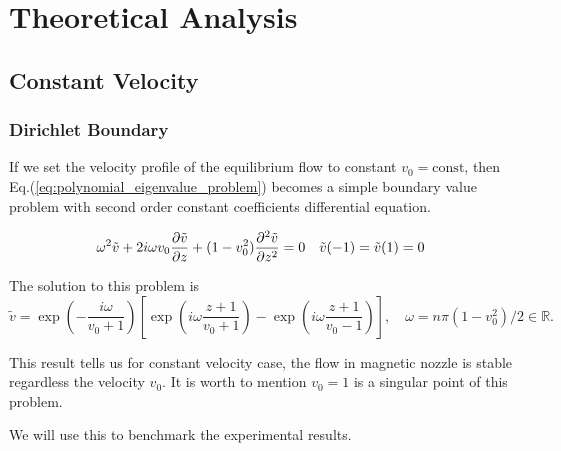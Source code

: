 \chapter{Theoretical Analysis} \label{chap:theoretical_analysis}
\section{Constant Velocity}
\subsection{Dirichlet Boundary}
If we set the velocity profile of the equilibrium flow to constant $v_0=\text{const}$, then Eq.(\ref{eq:polynomial_eigenvalue_problem}) becomes a simple boundary value problem with second order constant coefficients differential equation.

\begin{equation} \label{eq:constant_v_problem_dirichlet}
    \omega^2\tilde{v} + 2i\omega v_0\pdv{\tilde{v}}{z} + (1-v_0^2)\pdv[2]{\tilde{v}}{z} = 0
    \quad
    \tilde{v}(-1) = \tilde{v}(1) = 0
\end{equation}

The solution to this problem is
\begin{equation} \label{eq:constant_v_solution_dirichlet}
    \tilde{v} = \exp\left(-\frac{i\omega}{v_0+1}\right)
\left[ \exp\left(i\omega\frac{z+1}{v_0+1}\right) - \exp\left(i\omega\frac{z+1}{v_0-1}\right) \right], \quad \omega=n\pi(1-v_0^2)/2 \in \mathbb{R}.
\end{equation}

This result tells us for constant velocity case, the flow in magnetic nozzle is stable regardless the velocity $v_0$. It is worth to mention $v_0=1$ is a singular point of this problem.

We will use this to benchmark the experimental results. 

